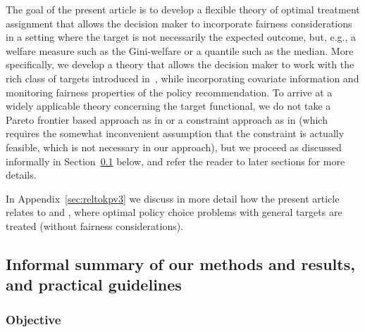 \documentclass[11pt, a4paper]{article}
\theoremstyle{definition}
\begin{document}
The goal of the present article is to develop a flexible theory of optimal treatment assignment that allows the decision maker to incorporate fairness considerations in a setting where the target is not necessarily the expected outcome, but, e.g., a welfare measure such as the Gini-welfare or a quantile such as the median. More specifically, we develop a theory that allows the decision maker to work with the rich class of targets introduced in~\cite{kpv1}, while incorporating covariate information and monitoring fairness properties of the policy recommendation. To arrive at a widely applicable theory concerning the target functional, we do not take a Pareto frontier based approach as in \cite{vivbra} or a constraint approach as in \cite{fang23} (which requires the somewhat inconvenient assumption that the constraint is actually feasible, which is not necessary in our approach), but we proceed as discussed informally in Section~\ref{sec:briefoutline} below, and refer the reader to later sections for more details. 

In Appendix~\ref{sec:reltokpv3} we discuss in more detail how the present article relates to \cite{kitagawa2019equality} and \cite{kpv3}, where optimal policy choice problems with general targets are treated (without fairness considerations).

\subsection{Informal summary of our methods and results, and practical guidelines}\label{sec:briefoutline}

\subsubsection{Objective}
\end{document}
